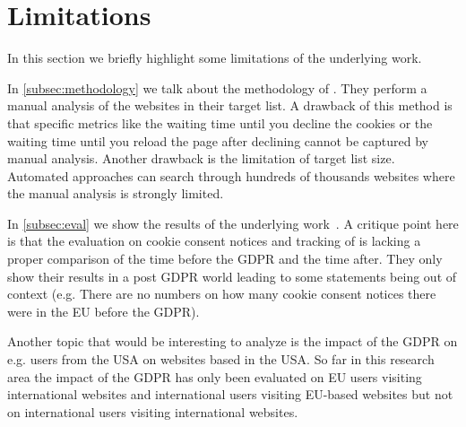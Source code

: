 \section{Limitations}
\label{sec:limitations}

In this section we briefly highlight some limitations of the underlying work.

In \autoref{subsec:methodology} we talk about the methodology of . They perform a manual analysis of
the websites in their target list. A drawback of this method is that specific metrics like the waiting time until you
decline the cookies or the waiting time until you reload the page after declining cannot be captured by manual analysis.
Another drawback is the limitation of target list size. Automated approaches can search through hundreds of thousands
websites where the manual analysis is strongly limited.

In \autoref{subsec:eval} we show the results of the underlying work~\cite{sanchez2019can}.
A critique point here is that the evaluation on cookie consent notices and tracking of \citeauthor{sanchez2019can}
is lacking a proper comparison of the time before
the GDPR and the time after. They only show their results in a post GDPR world leading to some statements being out of
context (e.g. There are no numbers on how many cookie consent notices there were in the EU before the GDPR).

Another topic that would be interesting to analyze is the impact of the GDPR on e.g. users from the USA on websites based in
the USA. So far in this research area the impact of the GDPR has only been evaluated on EU users visiting international websites and
international users visiting EU-based websites but not on international users visiting international websites.

